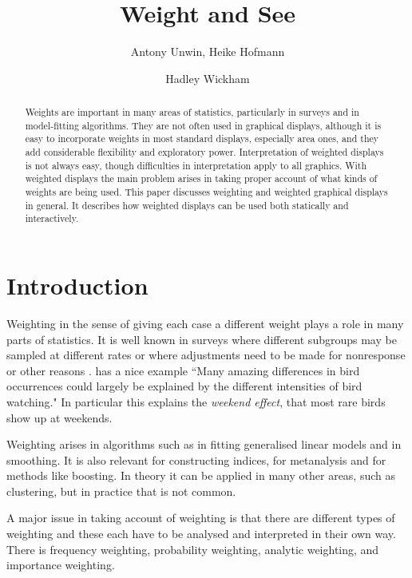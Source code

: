 \documentclass{svmult}
\begin{document}
\title*{Weight and See}
\author{
Antony Unwin, Heike Hofmann  \and Hadley Wickham
}

\maketitle

\begin{abstract}
Weights are important in many areas of statistics, particularly in surveys and in model-fitting algorithms.  They are not often used in graphical displays, although it is easy to incorporate weights in most standard displays, especially area ones, and they add considerable flexibility and exploratory power.  Interpretation of weighted displays is not always easy, though difficulties in interpretation apply to all graphics.   With weighted displays the main problem arises in taking proper account of what kinds of weights are being used.  This paper discusses weighting and weighted graphical displays in general.  It describes how weighted displays can be used both statically and interactively.
\end{abstract}

\section{Introduction}
\label{intro}
Weighting in the sense of giving each case a different weight plays a role in many parts of statistics.  It is well known in surveys where different subgroups may be sampled at different rates or where adjustments need to be made for nonresponse or other reasons \citep{kish:1990}.  \cite{hampel:1998} has a nice example ``Many amazing differences in bird occurrences could largely be explained by the different intensities of bird watching."  In particular this explains the \textit{weekend effect}, that most rare birds show up at weekends.

Weighting arises in algorithms such as in fitting generalised linear models and in smoothing.  It is also relevant for constructing indices, for metanalysis and for methods like boosting.  In theory it can be applied in many other areas, such as clustering, but in practice that is not common.

A major issue in taking account of weighting is that there are different types of weighting and these each have to be analysed and interpreted in their own way.  There is frequency weighting, probability weighting, analytic weighting, and importance weighting.
\end{document}
